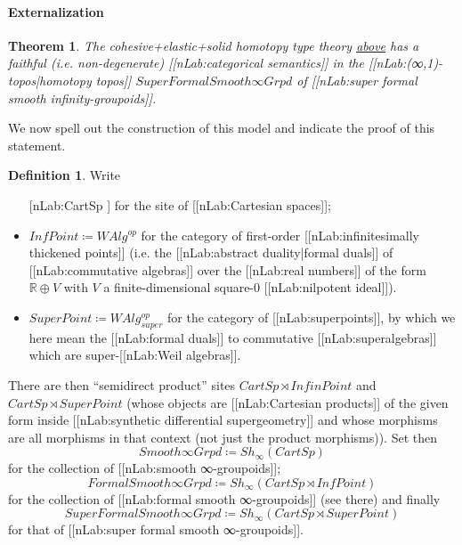 \documentclass[12pt,titlepage]{article}
\theoremstyle{plain}
\newtheorem{theorem}{Theorem}
\theoremstyle{definition}
\newtheorem{defn}{Definition}
\theoremstyle{remark}
\begin{document}
\hypertarget{Externalization}{}\paragraph*{{Externalization}}\label{Externalization}
\begin{theorem}
\label{SupergeometryIsModel}\hypertarget{SupergeometryIsModel}{}
The cohesive+elastic+solid homotopy type theory \hyperlink{ObjectiveLogic}{above} has a faithful (i.e. non-degenerate) [[nLab:categorical semantics]] in the [[nLab:(∞,1)-topos|homotopy topos]] $SuperFormalSmooth\infty Grpd$ of \emph{[[nLab:super formal smooth infinity-groupoids]]}.
\end{theorem}
We now spell out the construction of this model and indicate the proof of this statement.
\begin{defn}
\label{SupergeometricModel}\hypertarget{SupergeometricModel}{}
Write
\begin{itemize}%
\item [[nLab:CartSp]] for the site of [[nLab:Cartesian spaces]];
\item $InfPoint \coloneqq WAlg^{op}$ for the category of first-order [[nLab:infinitesimally thickened points]] (i.e. the [[nLab:abstract duality|formal duals]] of [[nLab:commutative algebras]] over the [[nLab:real numbers]] of the form $\mathbb{R}\oplus V$ with $V$ a finite-dimensional square-0 [[nLab:nilpotent ideal]]).
\item $SuperPoint \coloneqq WAlg_{super}^{op}$ for the category of [[nLab:superpoints]], by which we here mean the [[nLab:formal duals]] to commutative [[nLab:superalgebras]] which are super-[[nLab:Weil algebras]].
\end{itemize}
There are then ``semidirect product'' sites $CartSp \rtimes InfinPoint$ and $CartSp \rtimes SuperPoint$ (whose objects are [[nLab:Cartesian products]] of the given form inside [[nLab:synthetic differential supergeometry]] and whose morphisms are all morphisms in that context (not just the product morphisms)).
Set then
\begin{displaymath}
Smooth \infty Grpd \coloneqq Sh_\infty(CartSp)
\end{displaymath}
for the collection of [[nLab:smooth ∞-groupoids]];
\begin{displaymath}
FormalSmooth\infty Grpd \coloneqq Sh_\infty(CartSp \rtimes InfPoint)
\end{displaymath}
for the collection of [[nLab:formal smooth ∞-groupoids]] (see there) and finally
\begin{displaymath}
SuperFormalSmooth\infty Grpd \coloneqq Sh_\infty(CartSp \rtimes SuperPoint)
\end{displaymath}
for that of [[nLab:super formal smooth ∞-groupoids]].
\end{defn}
\end{document}
